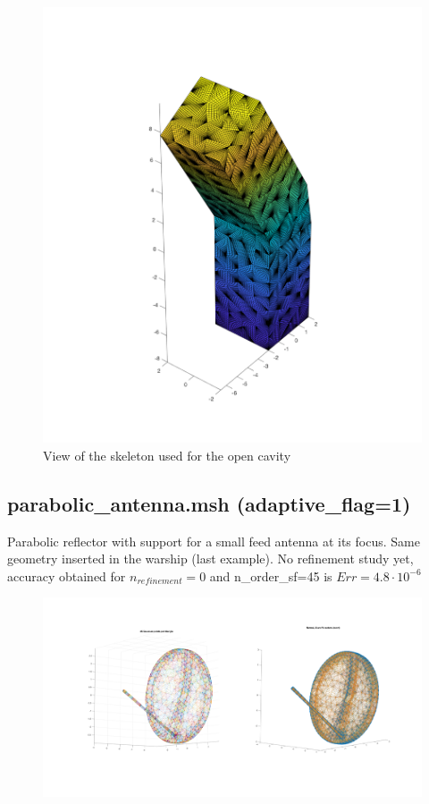 \documentclass[11pt, oneside]{article}   	%
\begin{document}
\begin{figure}[H]
\begin{center}
\includegraphics[width=6in]{open_cavity_skeleton_2.pdf}
\end{center}
\caption{View of the skeleton used for the open cavity}
\label{open_cavity_skeleton}
\end{figure}




\newpage
\subsection{parabolic\_antenna.msh (adaptive\_flag=1)}
Parabolic reflector with support for a small feed antenna at its focus. Same geometry inserted in the warship (last example). No refinement study yet, accuracy obtained for $n_{refinement}=0$ and n\_order\_sf=45 is $Err=4.8\cdot 10^{-6}$
\begin{figure}[H]
\begin{center}
\includegraphics[width=6in]{parabolic_antenna.pdf}
\end{center}
\caption{}
\label{parabolic_antenna}
\end{figure}
\end{document}
